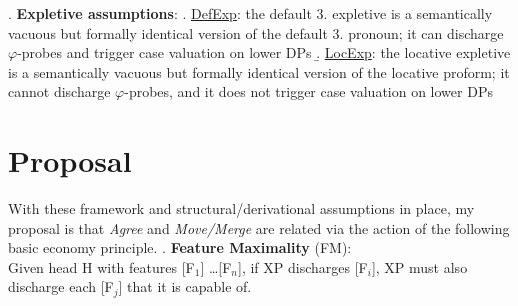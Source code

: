 \documentclass[11pt, letterpaper]{paper_nick}
\begin{document}
\ex. \textbf{Expletive assumptions}:
\a. \underline{DefExp}: the default 3. expletive is a semantically vacuous but formally identical version of the default 3. pronoun; it can discharge $\varphi$-probes and trigger case valuation on lower DPs
\b. \underline{LocExp}: the locative expletive is a semantically vacuous but formally identical version of the locative proform; it cannot discharge $\varphi$-probes, and it does not trigger case valuation on lower DPs



\section{Proposal}
With these framework and structural/derivational assumptions in place, my proposal is that \emph{Agree} and \emph{Move/Merge} are related via the action of the following basic economy principle. 
\ex. \textbf{Feature Maximality} (FM):\\
Given head H with features [F$_1$] \ldots [F$_n$], if XP discharges [F$_i$], XP must also discharge each [F$_j$] that it is capable of.
\end{document}
